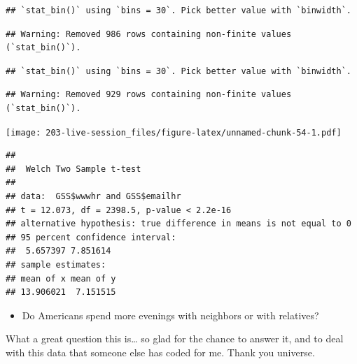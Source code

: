\documentclass[
]{book}
\newenvironment{Shaded}{\begin{snugshade}}{\end{snugshade}}
\newcommand{\AttributeTok}[1]{\textcolor[rgb]{0.13,0.29,0.53}{#1}}
\newcommand{\ConstantTok}[1]{\textcolor[rgb]{0.56,0.35,0.01}{#1}}
\newcommand{\FunctionTok}[1]{\textcolor[rgb]{0.13,0.29,0.53}{\textbf{#1}}}
\newcommand{\NormalTok}[1]{#1}
\newcommand{\SpecialCharTok}[1]{\textcolor[rgb]{0.81,0.36,0.00}{\textbf{#1}}}
\providecommand{\tightlist}{%
  \setlength{\itemsep}{0pt}\setlength{\parskip}{0pt}}
\theoremstyle{definition}
\theoremstyle{definition}
\theoremstyle{definition}
\theoremstyle{definition}
\theoremstyle{remark}
\begin{document}
\begin{verbatim}
## `stat_bin()` using `bins = 30`. Pick better value with `binwidth`.
\end{verbatim}

\begin{verbatim}
## Warning: Removed 986 rows containing non-finite values (`stat_bin()`).
\end{verbatim}

\begin{verbatim}
## `stat_bin()` using `bins = 30`. Pick better value with `binwidth`.
\end{verbatim}

\begin{verbatim}
## Warning: Removed 929 rows containing non-finite values (`stat_bin()`).
\end{verbatim}

\texttt{[image: 203-live-session\_files/figure-latex/unnamed-chunk-54-1.pdf]}

\begin{Shaded}
\end{Shaded}

\begin{verbatim}
## 
##  Welch Two Sample t-test
## 
## data:  GSS$wwwhr and GSS$emailhr
## t = 12.073, df = 2398.5, p-value < 2.2e-16
## alternative hypothesis: true difference in means is not equal to 0
## 95 percent confidence interval:
##  5.657397 7.851614
## sample estimates:
## mean of x mean of y 
## 13.906021  7.151515
\end{verbatim}

\begin{itemize}
\tightlist
\item
  Do Americans spend more evenings with neighbors or with relatives?
\end{itemize}

What a great question this is\ldots{} so glad for the chance to answer it, and to deal with this data that someone else has coded for me. Thank you universe.
\end{document}
